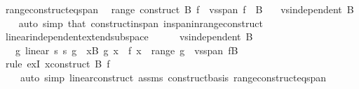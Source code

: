 \begin{isabellebody}
\isamarkupfalse%
%
\endisatagproof
{\isafoldproof}%
%
\isadelimproof
\isanewline
%
\endisadelimproof
\isanewline
{}\isamarkupfalse%
\ range{\isacharunderscore}{\kern0pt}construct{\isacharunderscore}{\kern0pt}eq{\isacharunderscore}{\kern0pt}span{\isacharcolon}{\kern0pt}\isanewline
\ \ {\isachardoublequoteopen}range\ {\isacharparenleft}{\kern0pt}construct\ B\ f{\isacharparenright}{\kern0pt}\ {\isacharequal}{\kern0pt}\ vs{}{\isachardot}{\kern0pt}span\ {\isacharparenleft}{\kern0pt}f\ {\isacharbackquote}{\kern0pt}\ B{\isacharparenright}{\kern0pt}{\isachardoublequoteclose}\isanewline
\ \ \ {\isachardoublequoteopen}vs{}{\isachardot}{\kern0pt}independent\ B{\isachardoublequoteclose}\isanewline
%
\isadelimproof
\ \ %
\endisadelimproof
%
\isatagproof
{}\isamarkupfalse%
\ {\isacharparenleft}{\kern0pt}auto\ simp{\isacharcolon}{\kern0pt}\ that\ construct{\isacharunderscore}{\kern0pt}in{\isacharunderscore}{\kern0pt}span\ in{\isacharunderscore}{\kern0pt}span{\isacharunderscore}{\kern0pt}in{\isacharunderscore}{\kern0pt}range{\isacharunderscore}{\kern0pt}construct{\isacharparenright}{\kern0pt}%
\endisatagproof
{\isafoldproof}%
%
\isadelimproof
\isanewline
%
\endisadelimproof
\isanewline
{}\isamarkupfalse%
\ linear{\isacharunderscore}{\kern0pt}independent{\isacharunderscore}{\kern0pt}extend{\isacharunderscore}{\kern0pt}subspace{\isacharcolon}{\kern0pt}\isanewline
\ \ %
\isanewline
\ \ \ {\isachardoublequoteopen}vs{}{\isachardot}{\kern0pt}independent\ B{\isachardoublequoteclose}\isanewline
\ \ \ {\isachardoublequoteopen}{\isasymexists}g{\isachardot}{\kern0pt}\ linear\ s{}\ s{}\ g\ {\isasymand}\ {\isacharparenleft}{\kern0pt}{\isasymforall}x{\isasymin}B{\isachardot}{\kern0pt}\ g\ x\ {\isacharequal}{\kern0pt}\ f\ x{\isacharparenright}{\kern0pt}\ {\isasymand}\ range\ g\ {\isacharequal}{\kern0pt}\ vs{}{\isachardot}{\kern0pt}span\ {\isacharparenleft}{\kern0pt}f{\isacharbackquote}{\kern0pt}B{\isacharparenright}{\kern0pt}{\isachardoublequoteclose}\isanewline
%
\isadelimproof
\ \ %
\endisadelimproof
%
\isatagproof
{}\isamarkupfalse%
\ {\isacharparenleft}{\kern0pt}rule\ exI{\isacharbrackleft}{\kern0pt}\ x{\isacharequal}{\kern0pt}{\isachardoublequoteopen}construct\ B\ f{\isachardoublequoteclose}{\isacharbrackright}{\kern0pt}{\isacharparenright}{\kern0pt}\isanewline
\ \ \ \ {\isacharparenleft}{\kern0pt}auto\ simp{\isacharcolon}{\kern0pt}\ linear{\isacharunderscore}{\kern0pt}construct\ assms\ construct{\isacharunderscore}{\kern0pt}basis\ range{\isacharunderscore}{\kern0pt}construct{\isacharunderscore}{\kern0pt}eq{\isacharunderscore}{\kern0pt}span{\isacharparenright}{\kern0pt}%

\end{isabellebody}
